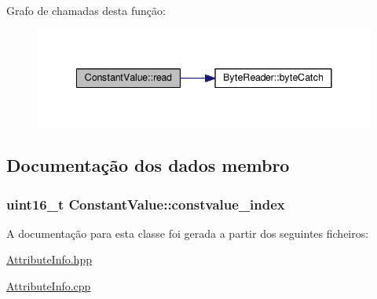 Grafo de chamadas desta função\+:
\nopagebreak
\begin{figure}[H]
\begin{center}
\leavevmode
\includegraphics[width=341pt]{class_constant_value_aee71ff590a730276c8da00dbdee74ecf_cgraph}
\end{center}
\end{figure}




\subsection{Documentação dos dados membro}
\subsubsection[{\texorpdfstring{constvalue\+\_\+index}{constvalue_index}}]{\setlength{\rightskip}{0pt plus 5cm}uint16\+\_\+t Constant\+Value\+::constvalue\+\_\+index}\hypertarget{class_constant_value_aaa51c41fc17e11c759e2d0dccbf178e8}{}\label{class_constant_value_aaa51c41fc17e11c759e2d0dccbf178e8}


A documentação para esta classe foi gerada a partir dos seguintes ficheiros\+:\begin{DoxyCompactItemize}
\item 
\hyperlink{_attribute_info_8hpp}{Attribute\+Info.\+hpp}\item 
\hyperlink{_attribute_info_8cpp}{Attribute\+Info.\+cpp}\end{DoxyCompactItemize}
